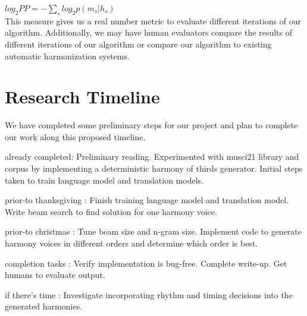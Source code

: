 \documentclass{sig-alternate}
\begin{document}
$log_2 PP = - \sum_{s} log_2 p(m_s|h_s)$\\

This measure gives us a real number metric to evaluate different iterations of our algorithm. Additionally, we may have
human evaluators compare the results of different iterations of our algorithm or compare our algorithm to existing 
automatic harmonization systems.


\section{Research Timeline}
\label{sec:research_timeline}
We have completed some preliminary steps for our project and plan to complete
our work along this proposed timeline.

\begin{itemize*}
	\item {\sc already completed}: Preliminary reading. Experimented with musci21 library and corpus by implementing a deterministic harmony of thirds generator. Initial steps taken to train language model and translation models.\vspace{3pt}
	\item {\sc prior-to thanksgiving} : Finish training language model and translation model. Write beam search to find solution for one harmony voice.\vspace{3pt}
	\item {\sc prior-to christmas} : Tune beam size and n-gram size. Implement code to generate harmony voices in different orders and determine which order is best.\vspace{3pt}
	\item {\sc completion tasks} : Verify implementation is bug-free. Complete write-up. Get humans to evaluate output.\vspace{3pt}
	\item {\sc if there's time} : Investigate incorporating rhythm and timing decisions into the generated harmonies.
\end{itemize*}

\end{document}
